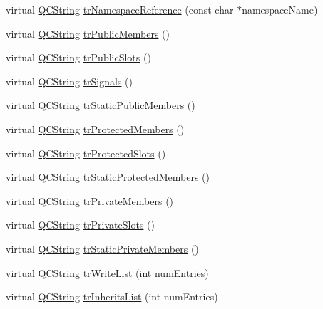 \begin{DoxyCompactItemize}
\item 
virtual \hyperlink{class_q_c_string}{Q\+C\+String} \hyperlink{class_translator_persian_ad281faac47e89f293a08f07b9bec47a4}{tr\+Namespace\+Reference} (const char $\ast$namespace\+Name)
\item 
virtual \hyperlink{class_q_c_string}{Q\+C\+String} \hyperlink{class_translator_persian_a0d9fc639ccd65a8eeb3937244cd83e9d}{tr\+Public\+Members} ()
\item 
virtual \hyperlink{class_q_c_string}{Q\+C\+String} \hyperlink{class_translator_persian_a315b36adc469b400c7b2fbf3174483af}{tr\+Public\+Slots} ()
\item 
virtual \hyperlink{class_q_c_string}{Q\+C\+String} \hyperlink{class_translator_persian_aeb894a64151a08b58293478659143fac}{tr\+Signals} ()
\item 
virtual \hyperlink{class_q_c_string}{Q\+C\+String} \hyperlink{class_translator_persian_ab3ad0b254176ada367b51f9113fbf7b8}{tr\+Static\+Public\+Members} ()
\item 
virtual \hyperlink{class_q_c_string}{Q\+C\+String} \hyperlink{class_translator_persian_adc332494f4255078b53691fdbccaa005}{tr\+Protected\+Members} ()
\item 
virtual \hyperlink{class_q_c_string}{Q\+C\+String} \hyperlink{class_translator_persian_a9ad67452cbcc62ffecd3886f745970d9}{tr\+Protected\+Slots} ()
\item 
virtual \hyperlink{class_q_c_string}{Q\+C\+String} \hyperlink{class_translator_persian_a189a87a1824b60c211d2f53fc787ad8b}{tr\+Static\+Protected\+Members} ()
\item 
virtual \hyperlink{class_q_c_string}{Q\+C\+String} \hyperlink{class_translator_persian_a3b98f40cdc8ec5a67da33b74ebb88da6}{tr\+Private\+Members} ()
\item 
virtual \hyperlink{class_q_c_string}{Q\+C\+String} \hyperlink{class_translator_persian_a26c70a4dc0ec36e8513ffd7711ce8966}{tr\+Private\+Slots} ()
\item 
virtual \hyperlink{class_q_c_string}{Q\+C\+String} \hyperlink{class_translator_persian_a0b563e7b4b8395a7f521d7cb08b07bb1}{tr\+Static\+Private\+Members} ()
\item 
virtual \hyperlink{class_q_c_string}{Q\+C\+String} \hyperlink{class_translator_persian_abb541f30146fe59839d7f0cfdc2155bd}{tr\+Write\+List} (int num\+Entries)
\item 
virtual \hyperlink{class_q_c_string}{Q\+C\+String} \hyperlink{class_translator_persian_acb93ef6516fa3a30171b96156dbba4ca}{tr\+Inherits\+List} (int num\+Entries)
\item 

\end{DoxyCompactItemize}
